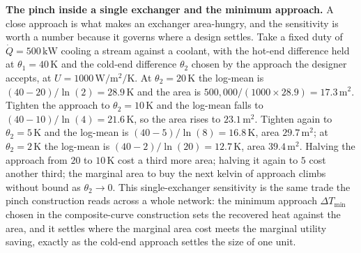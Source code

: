 \textbf{The pinch inside a single exchanger and the minimum approach.} A close
approach is what makes an exchanger area-hungry, and the sensitivity is worth a
number because it governs where a design settles. Take a fixed duty of $\dot{Q} =
500\,\text{kW}$ cooling a stream against a coolant, with the hot-end difference held
at $\theta_1 = 40\,\si{\kelvin}$ and the cold-end difference $\theta_2$ chosen by
the approach the designer accepts, at $U = 1000\,\si{\watt\per\meter\squared\per
\kelvin}$. At $\theta_2 = 20\,\si{\kelvin}$ the log-mean is $(40 - 20)/\ln(2) =
28.9\,\si{\kelvin}$ and the area is $500{,}000/(1000\times 28.9) = 17.3\,\text{m}^2$.
Tighten the approach to $\theta_2 = 10\,\si{\kelvin}$ and the log-mean falls to
$(40 - 10)/\ln(4) = 21.6\,\si{\kelvin}$, so the area rises to $23.1\,\text{m}^2$.
Tighten again to $\theta_2 = 5\,\si{\kelvin}$ and the log-mean is $(40 - 5)/\ln(8) =
16.8\,\si{\kelvin}$, area $29.7\,\text{m}^2$; at $\theta_2 = 2\,\si{\kelvin}$ the
log-mean is $(40 - 2)/\ln(20) = 12.7\,\si{\kelvin}$, area $39.4\,\text{m}^2$. Halving
the approach from $20$ to $10\,\si{\kelvin}$ cost a third more area; halving it again
to $5$ cost another third; the marginal area to buy the next kelvin of approach
climbs without bound as $\theta_2 \to 0$. This single-exchanger sensitivity is the
same trade the pinch construction reads across a whole network: the minimum approach
$\Delta T_{\min}$ chosen in the composite-curve construction sets the recovered heat
against the area, and it settles where the marginal area cost meets the marginal
utility saving, exactly as the cold-end approach settles the size of one unit.


